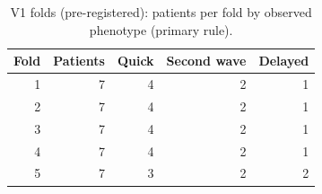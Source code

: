 \begin{table}[!htbp]
\centering
\small
\setlength{\tabcolsep}{3.5pt}
\caption{V1 folds (pre-registered): patients per fold by observed phenotype (primary rule).}
\label{tab:folds}
\begin{tabular}{rrrrr}
\toprule
Fold & Patients & Quick & Second wave & Delayed \\
\midrule
1 & 7 & 4 & 2 & 1 \\
2 & 7 & 4 & 2 & 1 \\
3 & 7 & 4 & 2 & 1 \\
4 & 7 & 4 & 2 & 1 \\
5 & 7 & 3 & 2 & 2 \\
\bottomrule
\end{tabular}
\end{table}
